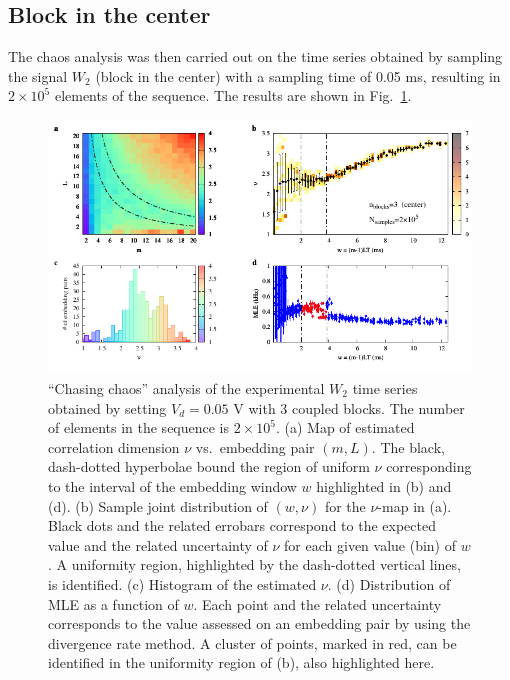 \subsection{Block in the center}\label{subsec: 3 blocks chaos center}

The chaos analysis was then carried out on the time series obtained by sampling the signal $W_2$
(block in the center) with a sampling time of 0.05 ms, resulting in $2\times10^5$ elements of the
sequence. The results are shown in Fig.~\ref{fig:3 blocks chaos center 2e5}.

\begin{figure}[!htbp]
    \centering
    \includegraphics[width=\linewidth]{../blocks/3_blocks/middle/2e5_points/plots/chaos_low.pdf}
    \caption{``Chasing chaos'' analysis of the experimental $W_2$ time series obtained by setting $V_d=0.05$ V with 3 coupled blocks.
    The number of elements in the sequence is $2\times10^5$.
    (a) Map of estimated correlation dimension $\nu$ vs.\ embedding pair $(m, L)$.
    The black, dash-dotted hyperbolae bound the region of uniform $\nu$ corresponding to the interval of the
    embedding window $w$ highlighted in (b) and (d).
    (b) Sample joint distribution of $(w,\nu)$ for the $\nu$-map in (a).
    Black dots and the related errobars correspond to the expected value and the related uncertainty of $\nu$
    for each given value (bin) of $w$. A uniformity region, highlighted by the dash-dotted vertical lines,
    is identified. (c) Histogram of the estimated $\nu$. (d) Distribution of MLE as a function of $w$. Each point and the related
    uncertainty corresponds to the value assessed on an embedding pair by using the divergence rate method.
    A cluster of points, marked in red, can be identified in the uniformity region of (b), also highlighted here.
    }\label{fig:3 blocks chaos center 2e5}
\end{figure}

